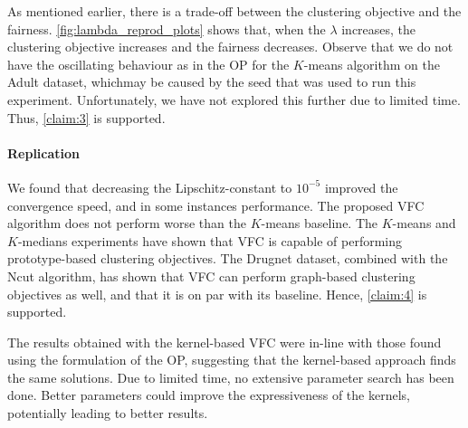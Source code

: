 As mentioned earlier, there is a trade-off between the clustering objective and the fairness. \autoref{fig:lambda_reprod_plots} shows that, when the $\lambda$ increases, the clustering objective increases and the fairness decreases. Observe that we do not have the oscillating behaviour as in the OP for the $K$-means algorithm on the Adult dataset, whichmay be caused by the seed that was used to run this experiment. Unfortunately, we have not explored this further due to limited time. Thus, \ref{claim:3} is supported. 

\paragraph{Replication}
We found that decreasing the Lipschitz-constant to $10^{-5}$ improved the convergence speed, and in some instances performance. The proposed VFC algorithm does not perform worse than the $K$-means baseline. The $K$-means and $K$-medians experiments have shown that VFC is capable of performing prototype-based clustering objectives. The Drugnet dataset, combined with the Ncut algorithm, has shown that VFC can perform graph-based clustering objectives as well, and that it is on par with its baseline. Hence, \ref{claim:4} is supported.

The results obtained with the kernel-based VFC were in-line with those found using the formulation of the OP, suggesting that the kernel-based approach finds the same solutions. Due to limited time, no extensive parameter search has been done. Better parameters could improve the expressiveness of the kernels, potentially leading to better results.

